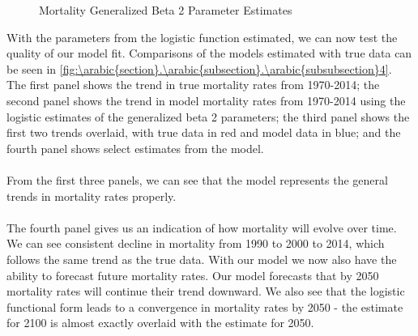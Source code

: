 \documentclass[10pt]{article}
\renewcommand{\thesection}{\arabic{section}}
\renewcommand{\thesubsection}{\thesection.\arabic{subsection}}
\renewcommand{\thesubsubsection}{\thesubsection.\arabic{subsubsection}}
\numberwithin{equation}{subsection}
\newcommand*{\FigureDir}{../../graphs}
\begin{document}
\begin{appendices}
\begin{figure}[H]
   \centering
   \caption{\label{fig:\thesubsubsection3}Mortality Generalized Beta 2 Parameter Estimates}
\end{figure}

\noindent
With the parameters from the logistic function estimated, we can now test the quality of our model fit. Comparisons of the models estimated with true data can be seen in \autoref{fig:\thesubsubsection4}. The first panel shows the trend in true mortality rates from 1970-2014; the second panel shows the trend in model mortality rates from 1970-2014 using the logistic estimates of the generalized beta 2 parameters; the third panel shows the first two trends overlaid, with true data in red and model data in blue; and the fourth panel shows select estimates from the model.
\\\\
From the first three panels, we can see that the model represents the general trends in mortality rates properly. 
\\\\
The fourth panel gives us an indication of how mortality will evolve over time. We can see consistent decline in mortality from 1990 to 2000 to 2014, which follows the same trend as the true data. With our model we now also have the ability to forecast future mortality rates. Our model forecasts that by 2050 mortality rates will continue their trend downward. We also see that the logistic functional form leads to a convergence in mortality rates by 2050 - the estimate for 2100 is almost exactly overlaid with the estimate for 2050.


\end{appendices}
\end{document}
